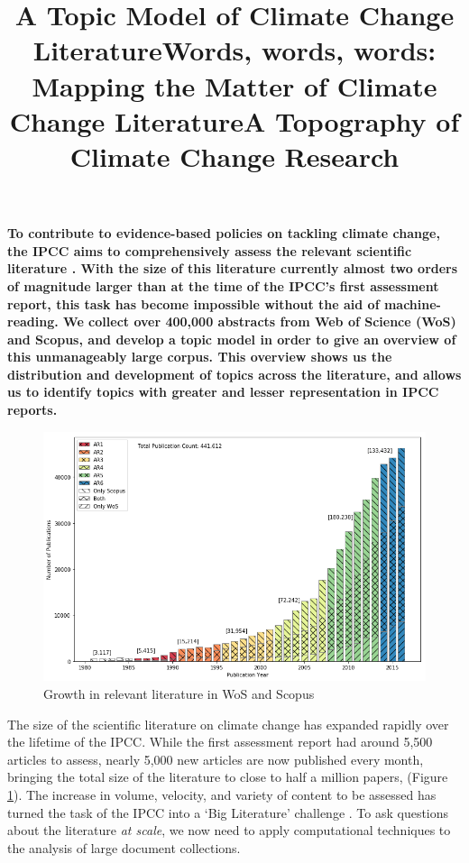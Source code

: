 \documentclass{article}
\title{A Topic Model of Climate Change Literature}
\title{Words, words, words: Mapping the Matter of Climate Change Literature}
\title{A Topography of Climate Change Research}
\begin{document}
\maketitle

\linenumbers

\textbf{
To contribute to evidence-based policies on tackling climate change, the IPCC aims to comprehensively assess the relevant scientific literature \citep{IPCC2013}. With the size of this literature currently almost two orders of magnitude larger than at the time of the IPCC's first assessment report, this task has become impossible without the aid of machine-reading. We collect over 400,000 abstracts from Web of Science (WoS) and Scopus, and develop a topic model in order to give an overview of this unmanageably large corpus. This overview shows us the distribution and development of topics across the literature, and allows us to identify topics with greater and lesser representation in IPCC reports. %
}

\begin{figure}
\begin{center}
	\includegraphics[width=0.8\linewidth]{plots/wos_scopus_docs_time}
    \caption{Growth in relevant literature in WoS and Scopus}
    \label{growth}
    \end{center}
\end{figure}

The size of the scientific literature on climate change has expanded rapidly over the lifetime of the IPCC. While the first assessment report had around 5,500 articles to assess, nearly 5,000 new articles are now published every month, bringing the total size of the literature to close to half a million papers, (Figure \ref{growth}).  The increase in volume, velocity, and variety of content to be assessed has turned the task of the IPCC into a `Big Literature' challenge \citep{Minx2017BigChange}. To ask questions about the literature \textit{at scale}, we now need to apply computational techniques to the analysis of large document collections.
\end{document}
